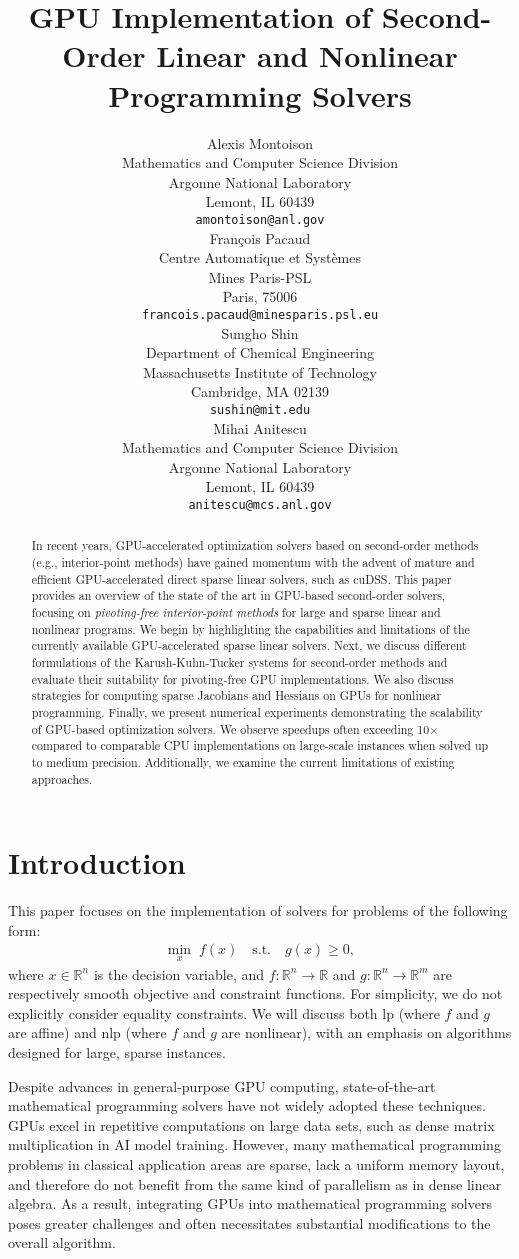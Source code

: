 \documentclass{article}
\title{GPU Implementation of Second-Order Linear and Nonlinear Programming Solvers}
\author{%
  Alexis Montoison\\
  Mathematics and Computer Science Division\\
  Argonne National Laboratory\\
  Lemont, IL 60439\\
  \texttt{amontoison@anl.gov}\\
  \And
  Fran\c{c}ois Pacaud\\
  Centre Automatique et Systèmes\\
  Mines Paris-PSL\\
  Paris, 75006 \\
  \texttt{francois.pacaud@minesparis.psl.eu}\\
  \And
  Sungho Shin\\
  Department of Chemical Engineering\\
  Massachusetts Institute of Technology\\
  Cambridge, MA 02139\\
  \texttt{sushin@mit.edu}\\
  \And
  Mihai Anitescu\\
  Mathematics and Computer Science Division\\
  Argonne National Laboratory\\
  Lemont, IL 60439\\
  \texttt{anitescu@mcs.anl.gov}\\
}
\begin{document}
\maketitle


\begin{abstract}
In recent years, GPU-accelerated optimization solvers based on second-order methods (e.g., interior-point methods) have gained momentum with the advent of mature and efficient GPU-accelerated direct sparse linear solvers, such as cuDSS.
This paper provides an overview of the state of the art in GPU-based second-order solvers, focusing on \emph{pivoting-free interior-point methods} for large and sparse linear and nonlinear programs.
We begin by highlighting the capabilities and limitations of the currently available GPU-accelerated sparse linear solvers.
Next, we discuss different formulations of the Karush-Kuhn-Tucker systems for second-order methods and evaluate their suitability for pivoting-free GPU implementations.
We also discuss strategies for computing sparse Jacobians and Hessians on GPUs for nonlinear programming.
Finally, we present numerical experiments demonstrating the scalability of GPU-based optimization solvers.
We observe speedups often exceeding 10× compared to comparable CPU implementations on large-scale instances when solved up to medium precision.
Additionally, we examine the current limitations of existing approaches.

\end{abstract}

\section{Introduction}\label{eqn:intro}

This paper focuses on the implementation of solvers for problems of the following form:
\begin{align}\label{eqn:opt}
  \min_{x } \; f(x) \quad \text{s.t.} \quad g(x) \geq 0,
\end{align}
where \(x \in \mathbb{R}^n\) is the decision variable, and \(f: \mathbb{R}^n \to \mathbb{R}\) and \(g: \mathbb{R}^n \to \mathbb{R}^m\) are respectively smooth objective and constraint functions.
For simplicity, we do not explicitly consider equality constraints.
We will discuss both \gls*{lp} (where \(f\) and \(g\) are affine) and \gls*{nlp} (where \(f\) and \(g\) are nonlinear), with an emphasis on algorithms designed for large, sparse instances.

Despite advances in general-purpose GPU computing, state-of-the-art mathematical programming solvers have not widely adopted these techniques. GPUs excel in repetitive computations on large data sets, such as dense matrix multiplication in AI model training. However, many mathematical programming problems in classical application areas are sparse, lack a uniform memory layout, and therefore do not benefit from the same kind of parallelism as in dense linear algebra. As a result, integrating GPUs into mathematical programming solvers poses greater challenges and often necessitates substantial modifications to the overall algorithm.
\end{document}
